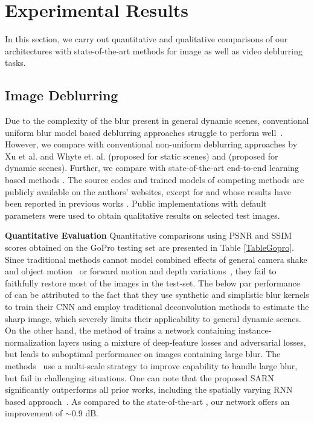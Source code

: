 \documentclass[10pt,twocolumn,letterpaper]{article}
\begin{document}
\section{Experimental Results}

In this section, we carry out quantitative and qualitative comparisons of our architectures with state-of-the-art methods for image as well as video deblurring tasks.

\subsection{Image Deblurring}
Due to the complexity of the blur present in general dynamic scenes, conventional uniform blur model based deblurring approaches struggle to perform well~\cite{nah2017deep}. However, we compare with conventional non-uniform deblurring approaches by Xu et al. \cite{xu2013unnatural} and Whyte et. al. \cite{whyte2012non} (proposed for static scenes)  and \cite{hyun2013dynamic} (proposed for dynamic scenes). Further, we compare with state-of-the-art end-to-end learning based methods \cite{nah2017deep,kupyn2017deblurgan,zhang2018dynamic,tao2018scale}. The source codes and trained models of competing methods are publicly available on the authors' websites, except for \cite{hyun2013dynamic} and \cite{zhang2018dynamic} whose results have been reported in previous works \cite{zhang2018dynamic,tao2018scale}. Public implementations with default parameters were used to obtain qualitative results on selected test images.


\noindent \textbf{Quantitative Evaluation}
Quantitative comparisons using PSNR and SSIM scores obtained on the GoPro testing set are presented in Table \ref{TableGopro}. Since traditional methods cannot model combined effects of general camera shake and object motion~\cite{xu2013unnatural,whyte2012non} or forward motion and depth variations~\cite{hyun2013dynamic}, they fail to faithfully restore most of the images in the test-set. The below par performance of \cite{sun2015learning,gong2017motion} can be attributed to the fact that they use synthetic and simplistic blur kernels to train their CNN and employ traditional deconvolution methods to estimate the sharp image, which severely limits their applicability to general dynamic scenes. On the other hand, the method of \cite{kupyn2017deblurgan} trains a network containing instance-normalization layers using a mixture of deep-feature losses and adversarial losses, but leads to suboptimal performance on images containing large blur. The methods~ \cite{nah2017deep,tao2018scale} use a multi-scale strategy to improve capability to handle large blur, but fail in challenging situations. One can note that the proposed SARN significantly outperforms all prior works, including the spatially varying RNN based approach~\cite{zhang2018dynamic}. As compared to the state-of-the-art \cite{tao2018scale}, our network offers an improvement of $\sim 0.9$ dB. 
 
\end{document}
